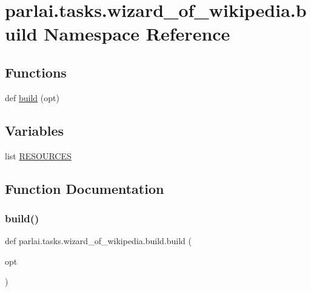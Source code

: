 \hypertarget{namespaceparlai_1_1tasks_1_1wizard__of__wikipedia_1_1build}{}\section{parlai.\+tasks.\+wizard\+\_\+of\+\_\+wikipedia.\+build Namespace Reference}
\label{namespaceparlai_1_1tasks_1_1wizard__of__wikipedia_1_1build}
\subsection*{Functions}
\begin{DoxyCompactItemize}
\item 
def \hyperlink{namespaceparlai_1_1tasks_1_1wizard__of__wikipedia_1_1build_a9675cda9046b7287141b050272699984}{build} (opt)
\end{DoxyCompactItemize}
\subsection*{Variables}
\begin{DoxyCompactItemize}
\item 
list \hyperlink{namespaceparlai_1_1tasks_1_1wizard__of__wikipedia_1_1build_a4c63e3a1540ac5cec10e79a90e2975a8}{R\+E\+S\+O\+U\+R\+C\+ES}
\end{DoxyCompactItemize}


\subsection{Function Documentation}
\mbox{\label{namespaceparlai_1_1tasks_1_1wizard__of__wikipedia_1_1build_a9675cda9046b7287141b050272699984}} 
\subsubsection{\texorpdfstring{build()}{build()}}
{\footnotesize\ttfamily def parlai.\+tasks.\+wizard\+\_\+of\+\_\+wikipedia.\+build.\+build (\begin{DoxyParamCaption}\item[{}]{opt }\end{DoxyParamCaption})}



